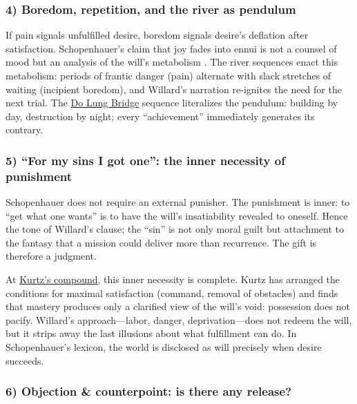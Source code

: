 \subsubsection*{4) Boredom, repetition, and the river as pendulum}

If pain signals unfulfilled desire, boredom signals desire's deflation after satisfaction.
Schopenhauer's claim that joy fades into ennui is not a counsel of mood but an analysis
of the will's metabolism \parencite[pp.~312--320]{SchopenhauerWWR1969}. The river sequences
enact this metabolism: periods of frantic danger (pain) alternate with slack stretches of
waiting (incipient boredom), and Willard's narration re-ignites the need for the next trial.
The \hyperref[scene:do-lung-bridge]{Do Lung Bridge} sequence literalizes the pendulum:
building by day, destruction by night; every ``achievement'' immediately generates its
contrary.

\subsubsection*{5) ``For my sins I got one'': the inner necessity of punishment}

Schopenhauer does not require an external punisher. The punishment is inner: to ``get what one
wants'' is to have the will's insatiability revealed to oneself. Hence the tone of Willard's
clause; the ``sin'' is not only moral guilt but attachment to the fantasy that a mission could
deliver more than recurrence. The gift is therefore a judgment.

At \hyperref[scene:kurtz-compound]{Kurtz's compound}, this inner necessity is complete. Kurtz
has arranged the conditions for maximal satisfaction (command, removal of obstacles) and finds
that mastery produces only a
clarified view of the will's void: possession does not pacify. Willard's approach—labor, danger,
deprivation—does not redeem the will, but it strips away the last illusions about what
fulfillment can do. In Schopenhauer's lexicon, the world is disclosed as will precisely when
desire succeeds.

\subsubsection*{6) Objection \& counterpoint: is there any release?}

